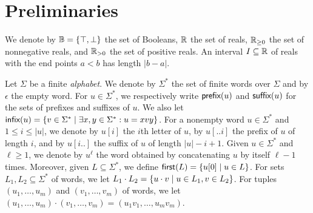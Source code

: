 \section{Preliminaries} \label{sec:preliminaries}

%
We denote by $\mathbb{B} = \{ \top, \bot \}$ the set of Booleans, $\mathbb{R}$ the set of reals, $\mathbb{R}_{\geq 0}$ the set of nonnegative reals, and $\mathbb{R}_{> 0}$ the 
set of positive reals.
%
An interval $I \subseteq \mathbb{R}$ of reals with the end points $a < b$ has length $|b-a|$.

Let $\Sigma$ be a finite {\em alphabet}.
%
We denote by $\Sigma^*$ the set of finite words over $\Sigma$ and by $\epsilon$ the empty word.
%
For $u \in \Sigma^*$, we respectively write $\textsf{prefix}(u)$ and $\textsf{suffix}(u)$ for the sets of prefixes 
and suffixes of $u$.
%
We also let $\infx(u) = \{v \in \Sigma^* \st \exists x,y \in \Sigma^* : u = xvy\}$.
%
For a nonempty word $u \in \Sigma^*$ and $1 \leq i \leq |u|$, we denote by $u[i]$ the $i$th letter of 
$u$, by $u[..i]$ the prefix of $u$ of length $i$, and by $u[i..]$ the suffix of $u$ of length $|u| - i + 1$. 
%
Given $u \in \Sigma^*$ and $\ell \geq 1$, we denote by $u^\ell$ the word obtained by concatenating $u$ by itself $\ell - 1$ times.
Moreover, given $L \subseteq \Sigma^*$, we define $\first(L) = \{ u[0] \st u \in L\}$.
For sets $L_1, L_2 \subseteq \Sigma^*$ of words, we let $L_1 \cdot L_2 = \{u \cdot v \st u \in L_1, v \in L_2\}$.
For tuples $(u_1, \ldots, u_m)$ and $(v_1, \ldots, v_m)$ of words, we let $(u_1, \ldots, u_m) \cdot (v_1, \ldots, v_m) = (u_1 v_1, \ldots, u_m v_m)$.

